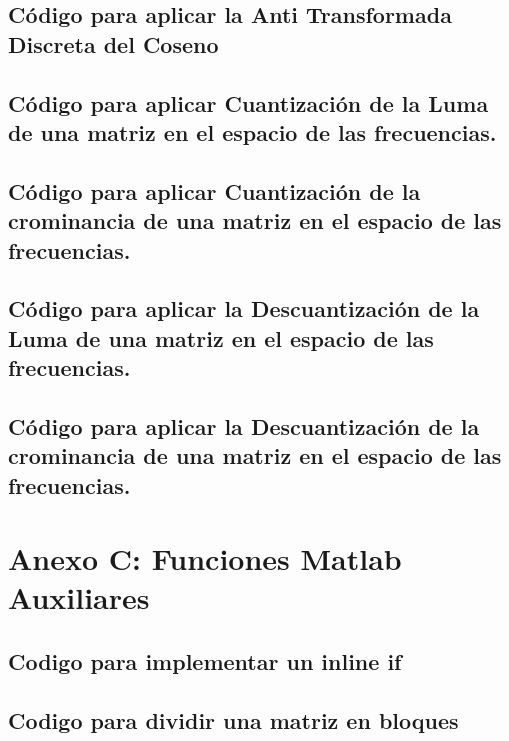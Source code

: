 \documentclass[%
	final,
	reprint,
	notitlepage,
	narroweqnarray,
	inline,
	twoside,
	invited
	]{ieee}
\begin{document}
\subsection{Código para aplicar la Anti Transformada Discreta del Coseno}

\newpage
\subsection{Código para aplicar Cuantización de la Luma de una matriz en el espacio de las frecuencias.}

\subsection{Código para aplicar Cuantización de la crominancia de una matriz en el espacio de las frecuencias.}

\subsection{Código para aplicar la Descuantización de la Luma de una matriz en el espacio de las frecuencias.}

\subsection{Código para aplicar la Descuantización de la crominancia de una matriz en el espacio de las frecuencias.}

\section*{Anexo C: Funciones Matlab Auxiliares}

\subsection{Codigo para implementar un inline if}

\newpage

\subsection{Codigo para dividir una matriz en bloques}
\end{document}
